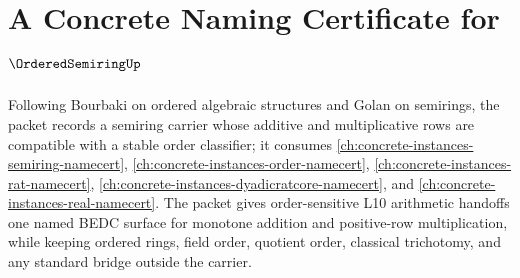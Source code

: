 \chapter{A Concrete Naming Certificate for $\OrderedSemiringUp$}
\label{ch:concrete-instances-ordered-semiring-namecert}

Following Bourbaki on ordered algebraic structures and Golan on semirings, the packet records a semiring carrier whose additive and multiplicative rows are compatible with a stable order classifier; it consumes \autoref{ch:concrete-instances-semiring-namecert}, \autoref{ch:concrete-instances-order-namecert}, \autoref{ch:concrete-instances-rat-namecert}, \autoref{ch:concrete-instances-dyadicratcore-namecert}, and \autoref{ch:concrete-instances-real-namecert}. The packet gives order-sensitive L10 arithmetic handoffs one named BEDC surface for monotone addition and positive-row multiplication, while keeping ordered rings, field order, quotient order, classical trichotomy, and any standard bridge outside the carrier.

